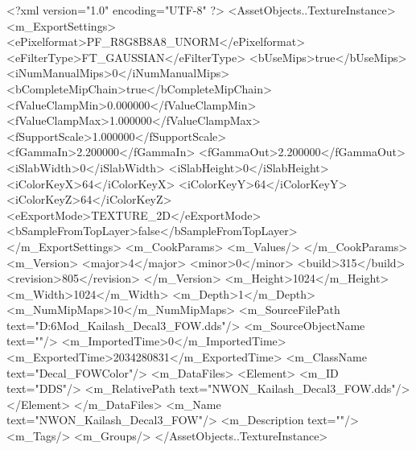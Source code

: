 <?xml version="1.0" encoding="UTF-8" ?>
<AssetObjects..TextureInstance>
	<m_ExportSettings>
		<ePixelformat>PF_R8G8B8A8_UNORM</ePixelformat>
		<eFilterType>FT_GAUSSIAN</eFilterType>
		<bUseMips>true</bUseMips>
		<iNumManualMips>0</iNumManualMips>
		<bCompleteMipChain>true</bCompleteMipChain>
		<fValueClampMin>0.000000</fValueClampMin>
		<fValueClampMax>1.000000</fValueClampMax>
		<fSupportScale>1.000000</fSupportScale>
		<fGammaIn>2.200000</fGammaIn>
		<fGammaOut>2.200000</fGammaOut>
		<iSlabWidth>0</iSlabWidth>
		<iSlabHeight>0</iSlabHeight>
		<iColorKeyX>64</iColorKeyX>
		<iColorKeyY>64</iColorKeyY>
		<iColorKeyZ>64</iColorKeyZ>
		<eExportMode>TEXTURE_2D</eExportMode>
		<bSampleFromTopLayer>false</bSampleFromTopLayer>
	</m_ExportSettings>
	<m_CookParams>
		<m_Values/>
	</m_CookParams>
	<m_Version>
		<major>4</major>
		<minor>0</minor>
		<build>315</build>
		<revision>805</revision>
	</m_Version>
	<m_Height>1024</m_Height>
	<m_Width>1024</m_Width>
	<m_Depth>1</m_Depth>
	<m_NumMipMaps>10</m_NumMipMaps>
	<m_SourceFilePath text="D:\Civ6Mod\Terrain\NW\Kailash\NewKailash\NWON_Kailash_Decal3_FOW.dds"/>
	<m_SourceObjectName text=""/>
	<m_ImportedTime>0</m_ImportedTime>
	<m_ExportedTime>2034280831</m_ExportedTime>
	<m_ClassName text="Decal_FOWColor"/>
	<m_DataFiles>
		<Element>
			<m_ID text="DDS"/>
			<m_RelativePath text="NWON_Kailash_Decal3_FOW.dds"/>
		</Element>
	</m_DataFiles>
	<m_Name text="NWON_Kailash_Decal3_FOW"/>
	<m_Description text=""/>
	<m_Tags/>
	<m_Groups/>
</AssetObjects..TextureInstance>

